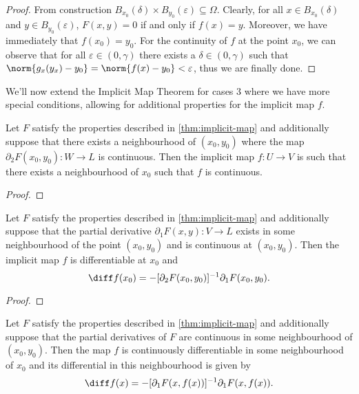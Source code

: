 \begin{proof}
From construction
\(B_{x_0}(\delta) \times B_{y_0}(\varepsilon) \subseteq \Omega\). Clearly, for
all \(x \in B_{x_0}(\delta)\) and \(y \in B_{y_0}(\varepsilon)\),
\(F(x, y) = 0\) if and only if \(f(x) = y\). Moreover, we have immediately that
\(f(x_0) = y_0\). For the continuity of \(f\) at the point \(x_0\), we can
observe that for all \(\varepsilon \in (0, \gamma)\) there exists a
\(\delta \in (0, \gamma)\) such that
\(\norm{g_x(y_x) - y_0} = \norm{f(x) - y_0} < \varepsilon\), thus we are finally
done.
\end{proof}

We'll now extend the Implicit Map Theorem for cases 3 where we have more
special conditions, allowing for additional properties for the implicit map
\(f\).

\begin{lemma}
\label{lem:continuity-implicit-map}
Let \(F\) satisfy the properties described in \cref{thm:implicit-map} and
additionally suppose that there exists a neighbourhood of \((x_0, y_0)\) where
the map \(\partial_2F(x_0, y_0): W \to L\) is continuous. Then the implicit map \(f: U
\to V\) is such that there exists a neighbourhood of \(x_0\) such that \(f\) is
continuous.
\end{lemma}

\begin{proof}

\end{proof}


\begin{lemma}
\label{lem:differential-implicit-map}
Let \(F\) satisfy the properties described in \cref{thm:implicit-map} and
additionally suppose that the partial derivative \(\partial_1F(x, y): V \to L\)
exists in some neighbourhood of the point \((x_0, y_0)\) and is continuous at
\((x_0, y_0)\). Then the implicit map \(f\) is differentiable at \(x_0\) and
\[
  \diff f(x_0) = - [\partial_2F(x_0, y_0)]^{-1} \partial_1 F(x_{0}, y_0).
\]
\end{lemma}

\begin{proof}

\end{proof}

\begin{lemma}
\label{lem:continuous-diff-implicit-map}
Let \(F\) satisfy the properties described in \cref{thm:implicit-map} and
additionally suppose that the partial derivatives of \(F\) are continuous in
some neighbourhood of \((x_0, y_0)\). Then the map \(f\) is continuously
differentiable in some neighbourhood of \(x_0\) and its differential in this
neighbourhood is given by
\[
  \diff f(x) = - [\partial_1F(x, f(x))]^{-1} \partial_1F(x, f(x)).
\]
\end{lemma}

